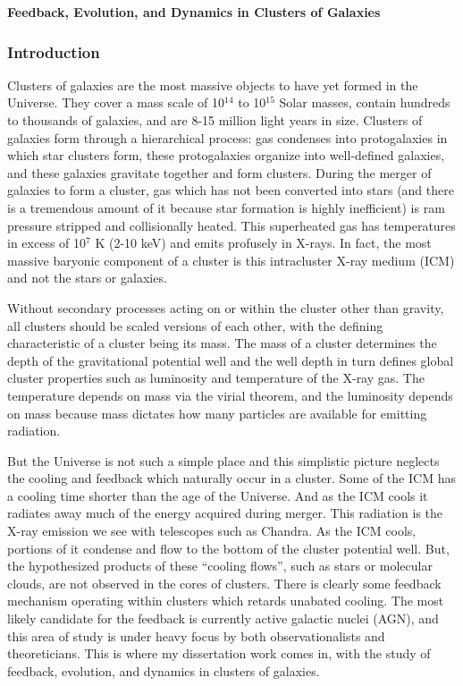 \documentclass[12pt]{plan}
\begin{document}
\begin{center}
\LARGE
\vspace{1.5mm}
{\bf Feedback, Evolution, and Dynamics in Clusters of Galaxies}\\
\vspace{1.5mm}
\end{center}
\small

\label{sec:intro}
\subsubsection*{Introduction}
Clusters of galaxies are the most massive objects to have yet formed
in the Universe. They cover a mass scale of 10$^{14}$ to 10$^{15}$ Solar
masses, contain hundreds to thousands of galaxies, and are 8-15
million light years in size. Clusters of galaxies form through a hierarchical
process: gas condenses into protogalaxies in which star clusters form,
these protogalaxies organize into well-defined galaxies, and these
galaxies gravitate together and form clusters. During the merger of galaxies to
form a cluster, gas which has not been converted into stars (and there
is a tremendous amount of it because star formation is highly
inefficient) is ram pressure stripped and collisionally
heated. This superheated gas has temperatures in excess of 10$^7$ K
(2-10 keV) and emits profusely in X-rays. In fact, the most massive
baryonic component of a cluster is this intracluster X-ray medium
(ICM) and not the stars or galaxies.

Without secondary processes acting on or within the cluster
other than gravity, all clusters should be scaled versions of each
other, with the defining characteristic of a cluster being its mass. The
mass of a cluster determines the depth of the gravitational potential
well and the well depth in turn defines global cluster properties such
as luminosity and temperature of the X-ray gas. The temperature
depends on mass via the virial theorem, and the luminosity depends on
mass because mass dictates how many particles are available for
emitting radiation. 

But the Universe is not such a simple place and this simplistic
picture neglects the cooling and feedback which naturally occur in a
cluster. Some of the ICM has a cooling time shorter than the age of
the Universe. And as the ICM cools it radiates away much of the energy
acquired during merger. This radiation is the X-ray emission we see
with telescopes such as Chandra. As the ICM cools, portions of it condense
and flow to the bottom of the cluster potential well. But, the
hypothesized products of these ``cooling flows'', such as stars or
molecular clouds, are not observed in the cores of clusters. There is
clearly some feedback mechanism operating within clusters which retards
unabated cooling. The most likely candidate for the feedback is
currently active galactic nuclei (AGN), and this area of study is
under heavy focus by both observationalists and theoreticians. This is
where my dissertation work comes in, with the study of feedback,
evolution, and dynamics in clusters of galaxies.
\end{document}
